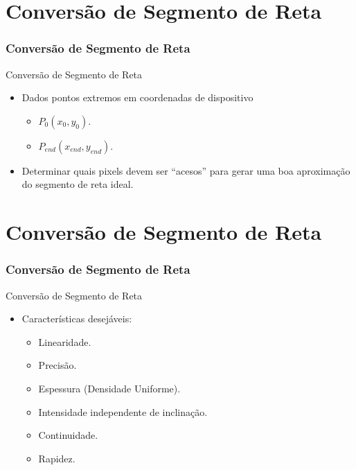 \documentclass{beamer}
\begin{document}
\section{Conversão de Segmento de Reta}
\begin{frame}
\frametitle{Conversão de Segmento de Reta}

		\begin{block}{Conversão de Segmento de Reta}
		\begin{itemize}
			\item Dados pontos extremos em coordenadas de dispositivo
			\begin{itemize}
				\item $P_0 (x_0,y_0)$.
				\item $P_{end} (x_{end},y_{end})$.
			\end{itemize}
			\item Determinar quais pixels devem ser ``acesos'' para gerar uma boa aproximação do segmento de reta ideal.
		\end{itemize}
	\end{block}
	
\end{frame}

\section{Conversão de Segmento de Reta}
\begin{frame}
\frametitle{Conversão de Segmento de Reta}

		\begin{block}{Conversão de Segmento de Reta}
		\begin{itemize}
			\item Características desejáveis:
			\begin{itemize}
				\item Linearidade.
				\item Precisão.
				\item Espessura (Densidade Uniforme).
				\item Intensidade independente de inclinação.
				\item Continuidade.
				\item Rapidez.
			\end{itemize}
		\end{itemize}
	\end{block}
	
\end{frame}
\end{document}

